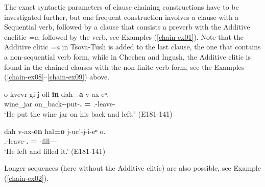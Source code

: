 The exact syntactic parameters of clause chaining constructions have to be investigated further, but one frequent construction involves a clause with a Sequential verb, followed by a clause that consists a preverb with the Additive enclitic \textit{=a}, followed by the verb, see Examples (\ref{chain-ex01}). Note that the Additive clitic \textit{=a} in Tsova-Tush is added to the last clause, the one that contains a non-sequential verb form, while in Chechen and Ingush, the Additive clitic is found in the chained clauses with the non-finite verb form, see the Examples (\ref{chain-ex08}--\ref{chain-ex09}) above.

\begin{exe}
	\ex\label{chain-ex01}
	\begin{xlist}
		
		
			\ex\label{chain-ex01a}
			\gll  o kvevr gi-j-oll-\textbf{in} daħ\textbf{=a} v-ax-eⁿ. \\
			{\Dist} wine\_jar on\_back-{\J}-put-\textbf{{\Aor}.{\Seq}} {\Pv}\textbf{={\Add}} {\M}.{\Sg}-leave-{\Aor}\\
			\trans `He put the wine jar on his back and left,'
			\hfill (E181-141)
		
		
		
			\ex\label{chain-ex01b}
			\gll daħ v-ax-\textbf{en} ħal\textbf{=o} j-uc'-j-i-eⁿ o. \\
			{\Pv} {\M}.{\Sg}-leave-\textbf{{\Aor}.{\Seq}} {\Pv}\textbf{={\Add}} {\J}-fill-{\J}-{\Tr}-{\Aor} {\Dist} \\
			\trans `He left and filled it.'
			\hfill (E181-141)
		
		
	\end{xlist}
\end{exe}

Longer sequences (here without the Additive clitic) are also possible, see Example (\ref{chain-ex02}).

